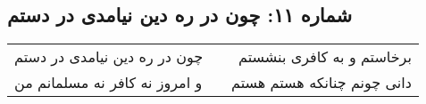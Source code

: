 \begin{center}
\section*{شماره ۱۱: چون در ره دین نیامدی در دستم}
\label{sec:011}
\begin{longtable}{l p{0.5cm} r}
چون در ره دین نیامدی در دستم
&&
برخاستم و به کافری بنشستم
\\
و امروز نه کافر نه مسلمانم من
&&
دانی چونم چنانکه هستم هستم
\\
\end{longtable}
\end{center}
